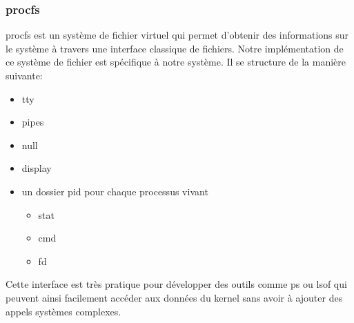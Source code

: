 \documentclass[10pt,a4paper]{beamer}
\begin{document}
\begin{frame}
  \frametitle{procfs}

  \textrm{procfs} est un système de fichier virtuel qui permet d'obtenir des informations sur le système à travers une interface classique de fichiers. Notre implémentation de ce système de fichier est spécifique à notre système. Il se structure de la manière suivante:

  \begin{itemize}
  \item tty
  \item pipes
  \item null
  \item display
  \item un dossier \textrm{pid} pour chaque processus vivant
    \begin{itemize}
    \item stat
    \item cmd
    \item fd
    \end{itemize}
  \end{itemize}

  Cette interface est très pratique pour développer des outils comme \textrm{ps} ou \textrm{lsof} qui peuvent ainsi facilement accéder aux données du kernel sans avoir à ajouter des appels systèmes complexes.
\end{frame}
\end{document}
